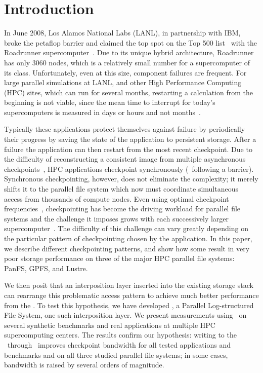 \section{Introduction}



In June 2008, Los Alamos National Labs (LANL), in partnership with IBM, broke
the petaflop barrier and claimed the top spot on the Top 500 list~\cite{top500}
with the Roadrunner supercomputer~\cite{roadrunner}.  Due to its unique hybrid
architecture, Roadrunner has only 3060 nodes, which is a relatively small
number for a supercomputer of its class.  Unfortunately, even at this size,
component failures are frequent.  For large parallel simulations at
LANL, and other High Performance Computing (HPC) sites, which can run for
several months, restarting a calculation from the beginning is not viable,
since the mean time to interrupt for today's supercomputers is measured in days
or hours and not months~\cite{google-failure,schroeder-failure}.  



Typically these applications protect themselves against failure by periodically
 their progress by saving the state of the application to
persistent storage. After a failure the application can then restart from the most recent 
checkpoint.  Due to the difficulty of reconstructing a consistent
image from multiple asynchronous checkpoints~\cite{lamport1978}, HPC
applications checkpoint synchronously (\ie\ following a barrier).  Synchronous
checkpointing, however, does not eliminate the complexity; it merely shifts it to
the parallel file system which now must coordinate simultaneous access from
thousands of compute nodes.  Even using optimal checkpoint frequencies~\cite{daly-optimal}, 
checkpointing has become the driving workload for
parallel file systems and the challenge it imposes grows with each successively
larger supercomputer~\cite{pcl:99:me,schroeder2007}.  The difficulty of this
challenge can vary greatly depending on the particular pattern of checkpointing
chosen by the application. 
In this paper, we describe different checkpointing patterns, and show how some
result in very poor storage performance on three of the major HPC
parallel file systems: PanFS, GPFS, and Lustre.  

We then posit that an
interposition layer inserted into the existing storage stack can rearrange this
problematic access pattern to achieve much better performance from the
\upfs.  To test this hypothesis, we have developed \plfs, a Parallel
Log-structured File System, one such interposition layer.  We present measurements using \plfs\ on several synthetic benchmarks and real applications at multiple HPC supercomputing centers.  The
results confirm our hypothesis: writing to the \upfs\ through
\plfs\ improves checkpoint bandwidth for all tested applications and
benchmarks and on all three studied parallel file systems; in some cases,
bandwidth is raised by several orders of magnitude.

